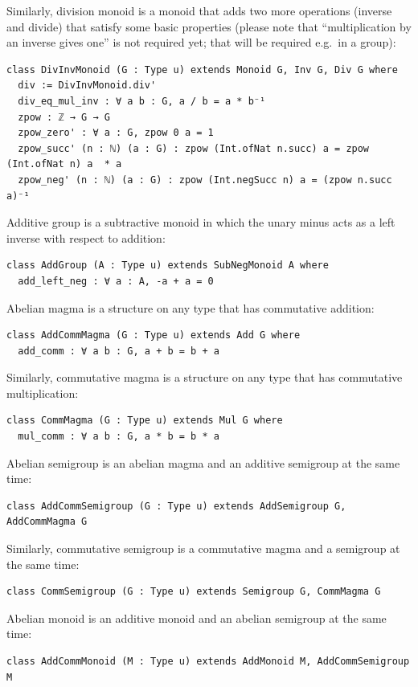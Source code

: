 \documentclass[]{article}
\renewcommand{\.}{\hskip .75pt}
\begin{document}
Similarly, division monoid is a monoid that adds two more operations (inverse and divide)
that satisfy some basic properties (please note that ``multiplication by an inverse gives one''
is not required yet; that will be required e.g.~in a group):
\begin{lstlisting}
class DivInvMonoid (G : Type u) extends Monoid G, Inv G, Div G where
  div := DivInvMonoid.div'
  div_eq_mul_inv : ∀ a b : G, a / b = a * b⁻¹ 
  zpow : ℤ → G → G
  zpow_zero' : ∀ a : G, zpow 0 a = 1 
  zpow_succ' (n : ℕ) (a : G) : zpow (Int.ofNat n.succ) a = zpow (Int.ofNat n) a  * a
  zpow_neg' (n : ℕ) (a : G) : zpow (Int.negSucc n) a = (zpow n.succ a)⁻¹ 
\end{lstlisting}
Additive group is a subtractive monoid in which the unary minus acts as a left inverse with respect to addition:
\begin{lstlisting}
class AddGroup (A : Type u) extends SubNegMonoid A where
  add_left_neg : ∀ a : A, -a + a = 0
\end{lstlisting}
Abelian magma is a structure on any type that has commutative addition:
\begin{lstlisting}
class AddCommMagma (G : Type u) extends Add G where
  add_comm : ∀ a b : G, a + b = b + a
\end{lstlisting}
Similarly, commutative magma is a structure on any type that has commutative multiplication:
\begin{lstlisting}
class CommMagma (G : Type u) extends Mul G where
  mul_comm : ∀ a b : G, a * b = b * a
\end{lstlisting}
Abelian semigroup is an abelian magma and an additive semigroup at the same time:
\begin{lstlisting}
class AddCommSemigroup (G : Type u) extends AddSemigroup G, AddCommMagma G
\end{lstlisting}
Similarly, commutative semigroup is a commutative magma and a semigroup at the same time:
\begin{lstlisting}
class CommSemigroup (G : Type u) extends Semigroup G, CommMagma G
\end{lstlisting}
Abelian monoid is an additive monoid and an abelian semigroup at the same time:
\begin{lstlisting}
class AddCommMonoid (M : Type u) extends AddMonoid M, AddCommSemigroup M
\end{lstlisting}
\end{document}
